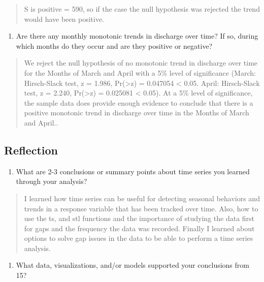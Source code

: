 \documentclass[]{article}
\providecommand{\tightlist}{%
  \setlength{\itemsep}{0pt}\setlength{\parskip}{0pt}}
\begin{document}
\begin{quote}
S is positive = 590, so if the case the null hypothesis was rejected the
trend would have been positive.
\end{quote}

\begin{enumerate}
\def\labelenumi{\arabic{enumi}.}
\setcounter{enumi}{13}
\tightlist
\item
  Are there any monthly monotonic trends in discharge over time? If so,
  during which months do they occur and are they positive or negative?
\end{enumerate}

\begin{quote}
We reject the null hypothesis of no monotonic trend in discharge over
time for the Months of March and April with a 5\% level of significance
(March: Hirsch-Slack test, z = 1.986, Pr(\textgreater\textbar z\textbar)
= 0.047054 \textless{} 0.05. April: Hirsch-Slack test, z = 2.240,
Pr(\textgreater\textbar z\textbar) = 0.025081 \textless{} 0.05). At a
5\% level of significance, the sample data does provide enough evidence
to conclude that there is a positive monotonic trend in discharge over
time in the Months of March and April..
\end{quote}

\hypertarget{reflection}{%
\subsection{Reflection}\label{reflection}}

\begin{enumerate}
\def\labelenumi{\arabic{enumi}.}
\setcounter{enumi}{14}
\tightlist
\item
  What are 2-3 conclusions or summary points about time series you
  learned through your analysis?
\end{enumerate}

\begin{quote}
I learned how time series can be useful for detecting seasonal behaviors
and trends in a response variable that has been tracked over time. Also,
how to use the ts, and stl functions and the importance of studying the
data first for gaps and the frequency the data was recorded. Finally I
learned about options to solve gap issues in the data to be able to
perform a time series analysis.
\end{quote}

\begin{enumerate}
\def\labelenumi{\arabic{enumi}.}
\setcounter{enumi}{15}
\tightlist
\item
  What data, visualizations, and/or models supported your conclusions
  from 15?
\end{enumerate}
\end{document}
